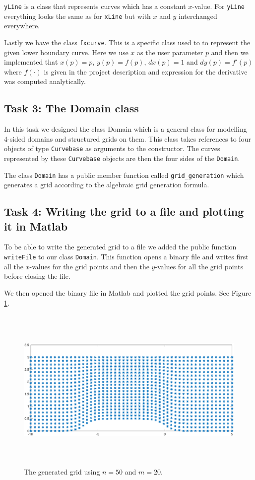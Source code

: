 \documentclass[a4paper,10pt]{article}
\begin{document}
\texttt{yLine} is a class that represents curves which has a constant $x$-value. For \texttt{yLine} everything looks the same as for \texttt{xLine} but with $x$ and $y$ interchanged everywhere.

Lastly we have the class \texttt{fxcurve}. This is a specific class used to to represent the given lower boundary curve. Here we use $x$ as the user parameter $p$ and then we implemented that $x(p) = p$, $y(p) = f(p)$, $dx(p) = 1$ and $dy(p) = f'(p)$ where $f(\cdot)$ is given in the project description and expression for the derivative was computed analytically.  
 

\subsection*{Task 3: The Domain class}
In this task we designed the class Domain which is a general class for modelling 4-sided domains and structured grids on them. This class takes references to four objects of type \texttt{Curvebase} as arguments to the constructor. The curves represented by these \texttt{Curvebase} objects are then the four sides of the \texttt{Domain}. 


The class \texttt{Domain} has a public member function called \texttt{grid\_generation} which generates a grid according to the algebraic grid generation formula.

\subsection*{Task 4: Writing the grid to a file and plotting it in Matlab}
To be able to write the generated grid to a file we added the public function \texttt{writeFile} to our class \texttt{Domain}. This function opens a binary file and writes first all the $x$-values for the grid points and then the $y$-values for all the grid points before closing the file. 

We then opened the binary file in Matlab and plotted the grid points. See Figure \ref{FIG_jjj}.

\begin{figure}[!ht]
  \centering
  \includegraphics[width = 13cm, height = 8cm]{50x20}
  \begin{minipage}[t]{100mm}
    \caption{
      The generated grid using $n = 50$ and $m = 20$.
    }\label{FIG_jjj}
  \end{minipage}
\end{figure}
\end{document}
